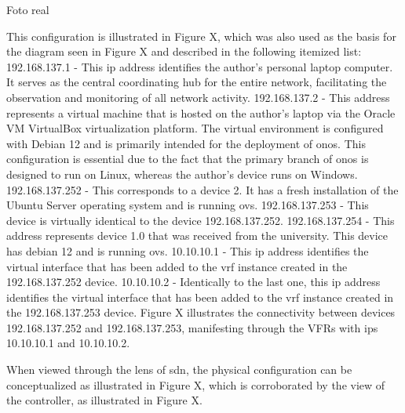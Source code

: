 Foto real

This configuration is illustrated in Figure X, which was also used as the basis for the diagram seen in Figure X and described in the following itemized list:
192.168.137.1 - This \gls{ip} address identifies the author's personal laptop computer. It serves as the central coordinating hub for the entire network, facilitating the observation and monitoring of all network activity.
192.168.137.2 - This address represents a virtual machine that is hosted on the author's laptop via the Oracle VM VirtualBox virtualization platform. The virtual environment is configured with Debian 12 and is primarily intended for the deployment of \gls{onos}. This configuration is essential due to the fact that the primary branch of \gls{onos} is designed to run on Linux, whereas the author's device runs on Windows.
192.168.137.252 - This corresponds to a device 2. It has a fresh installation of the Ubuntu Server operating system and is running \gls{ovs}.
192.168.137.253 - This device is virtually identical to the device 192.168.137.252.
192.168.137.254 - This address represents device 1.0 that was received from the university. This device has debian 12 and is running \gls{ovs}.
10.10.10.1 - This \gls{ip} address identifies the virtual interface that has been added to the \gls{vrf} instance created in the 192.168.137.252 device.
10.10.10.2 - Identically to the last one, this \gls{ip} address identifies the virtual interface that has been added to the \gls{vrf} instance created in the 192.168.137.253 device.
Figure X illustrates the connectivity between devices 192.168.137.252 and 192.168.137.253, manifesting through the VFRs with \glspl{ip} 10.10.10.1 and 10.10.10.2.

When viewed through the lens of \gls{sdn}, the physical configuration can be conceptualized as illustrated in Figure X, which is corroborated by the view of the controller, as illustrated in Figure X.


